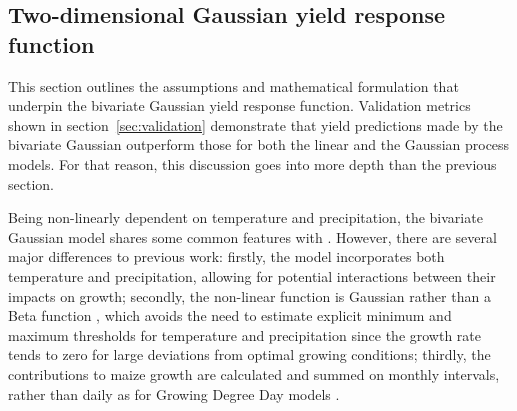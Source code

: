 \documentclass[12pt]{article}
\begin{document}
\subsection{Two-dimensional Gaussian yield response function}
\label{sec:2d_descrip_appendix}


This section outlines the assumptions and mathematical formulation that underpin the bivariate Gaussian yield response function. Validation metrics shown in section~\ref{sec:validation} demonstrate that yield predictions made by the bivariate Gaussian outperform those for both the linear and the Gaussian process models. For that reason, this discussion goes into more depth than the previous section.

Being non-linearly dependent on temperature and precipitation, the bivariate Gaussian model shares some common features with \cite{cutforth:1990, streck:2007, yin:1995, zhou:2018}. However, there are several major differences to previous work: firstly, the model incorporates both temperature and precipitation, allowing for potential interactions between their impacts on growth; secondly, the non-linear function is Gaussian rather than a Beta function \citep[e.g.][]{yin:1995, streck:2007}, which avoids the need to estimate explicit minimum and maximum thresholds for temperature and precipitation since the growth rate tends to zero for large deviations from optimal growing conditions; thirdly, the contributions to maize growth are calculated and summed on monthly intervals, rather than daily as for Growing Degree Day models \citep[e.g.][]{zhou:2018}.
\end{document}
